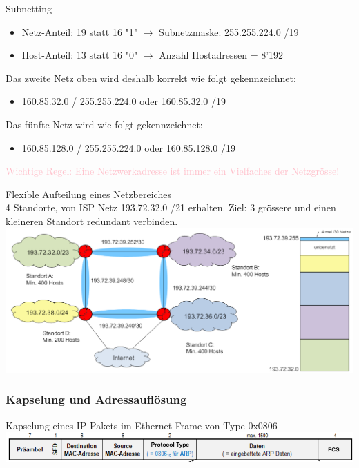 \begin{concept}{Subnetting}
    \begin{itemize}
        \item Netz-Anteil: 19 statt 16 "1" $\rightarrow$ Subnetzmaske: 255.255.224.0 /19
        \item Host-Anteil: 13 statt 16 "0" $\rightarrow$ Anzahl Hostadressen = 8'192
    \end{itemize}
    Das zweite Netz oben wird deshalb korrekt wie folgt gekennzeichnet:
    \begin{itemize}
        \item 160.85.32.0 / 255.255.224.0 oder 160.85.32.0 /19
    \end{itemize}
    Das fünfte Netz wird wie folgt gekennzeichnet:
    \begin{itemize}
        \item 160.85.128.0 / 255.255.224.0 oder 160.85.128.0 /19
    \end{itemize}
    \textcolor{pink}{Wichtige Regel: Eine Netzwerkadresse ist immer ein Vielfaches der Netzgrösse!}
\end{concept}

\begin{example2}{Flexible Aufteilung eines Netzbereiches}\\
    4 Standorte, von ISP Netz 193.72.32.0 /21 erhalten. Ziel: 3 grössere und einen kleineren Standort redundant verbinden.\\
        \includegraphics[width=1\linewidth]{images/flexible_aufteilung_netzbereich.png}    
\end{example2}





\columnbreak

\subsubsection{Kapselung und Adressauflösung}

\begin{definition}{Kapselung eines IP-Pakets im Ethernet Frame} von Type 0x0806\\
        \includegraphics[width=1\linewidth]{images/kapselung_ip_paket.png}
\end{definition}



